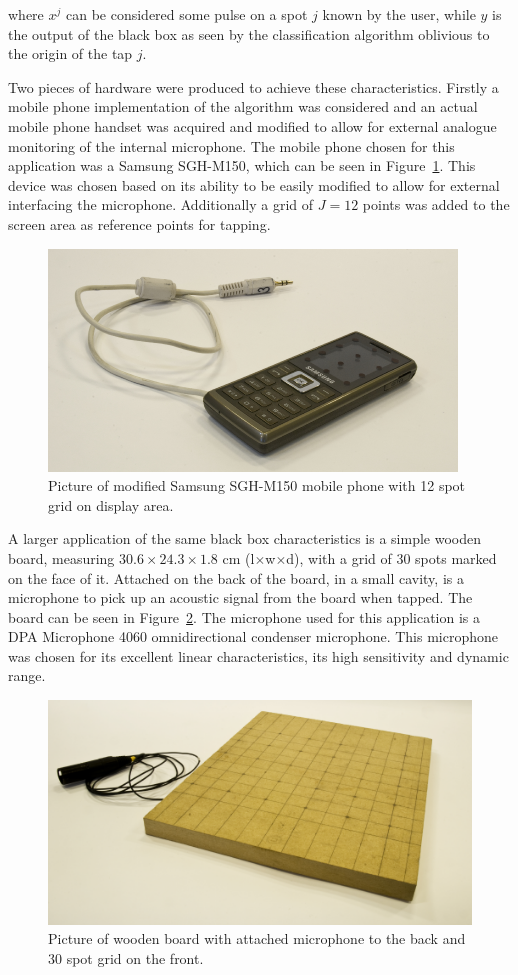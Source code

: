 where $x^j$ can be considered some pulse on a spot $j$ known by the user, while $y$ is the output of the black box as seen by the classification algorithm oblivious to the origin of the tap $j$.

Two pieces of hardware were produced to achieve these characteristics. Firstly a mobile phone implementation of the algorithm was considered and an actual mobile phone handset was acquired and modified to allow for external analogue monitoring of the internal microphone. The mobile phone chosen for this application was a Samsung SGH-M150, which can be seen in Figure~\ref{fig:phone}. This device was chosen based on its ability to be easily modified to allow for external interfacing the microphone. Additionally a grid of $J = 12$ points was added to the screen area as reference points for tapping.

\begin{figure}[!]
\centering
\includegraphics[width=410 px]{phone.png}
\caption{Picture of modified Samsung SGH-M150 mobile phone with 12 spot grid on display area.}\label{fig:phone}
\end{figure}

A larger application of the same black box characteristics is a simple wooden board, measuring $30.6 \times 24.3 \times 1.8$ cm (l$\times$w$\times$d), with a grid of 30 spots marked on the face of it. Attached on the back of the board, in a small cavity, is a microphone to pick up an acoustic signal from the board when tapped.  The board can be seen in Figure~\ref{fig:Pad}. The microphone used for this application is a DPA Microphone 4060 omnidirectional condenser microphone. This microphone was chosen for its excellent linear characteristics, its high sensitivity and dynamic range.

\begin{figure}[!]
\centering
\includegraphics[width=410 px]{Pad.png}
\caption{Picture of wooden board with attached microphone to the back and 30 spot grid on the front.}\label{fig:Pad}
\end{figure}

